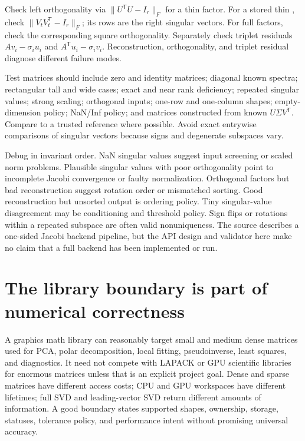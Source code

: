 Check left orthogonality via \(\|U^\mathsf TU-I_r\|_F\) for a thin factor. For a stored thin , check \(\|V_tV_t^\mathsf T-I_r\|_F\); its rows are the right singular vectors. For full factors, check the corresponding square orthogonality. Separately check triplet residuals \(Av_i-\sigma_i u_i\) and \(A^\mathsf Tu_i-\sigma_i v_i\). Reconstruction, orthogonality, and triplet residual diagnose different failure modes.

Test matrices should include zero and identity matrices; diagonal known spectra; rectangular tall and wide cases; exact and near rank deficiency; repeated singular values; strong scaling; orthogonal inputs; one-row and one-column shapes; empty-dimension policy; NaN/Inf policy; and matrices constructed from known \(U\Sigma V^\mathsf T\). Compare to a trusted reference where possible. Avoid exact entrywise comparisons of singular vectors because signs and degenerate subspaces vary.

Debug in invariant order. NaN singular values suggest input screening or scaled norm problems. Plausible singular values with poor orthogonality point to incomplete Jacobi convergence or faulty normalization. Orthogonal factors but bad reconstruction suggest rotation order or mismatched sorting. Good reconstruction but unsorted output is ordering policy. Tiny singular-value disagreement may be conditioning and threshold policy. Sign flips or rotations within a repeated subspace are often valid nonuniqueness. The source describes a one-sided Jacobi backend pipeline, but the API design and validator here make no claim that a full backend has been implemented or run.

\section{The library boundary is part of numerical correctness}\label{02-foundations-ii-ch038-the-library-boundary-is-part-of-numerical-correctness}

\hypertarget{02-foundations-ii-ch038-the-library-boundary-is-part-of-numerical-correctness}{}

A graphics math library can reasonably target small and medium dense matrices used for PCA, polar decomposition, local fitting, pseudoinverse, least squares, and diagnostics. It need not compete with LAPACK or GPU scientific libraries for enormous matrices unless that is an explicit project goal. Dense and sparse matrices have different access costs; CPU and GPU workspaces have different lifetimes; full SVD and leading-vector SVD return different amounts of information. A good boundary states supported shapes, ownership, storage, statuses, tolerance policy, and performance intent without promising universal accuracy.


